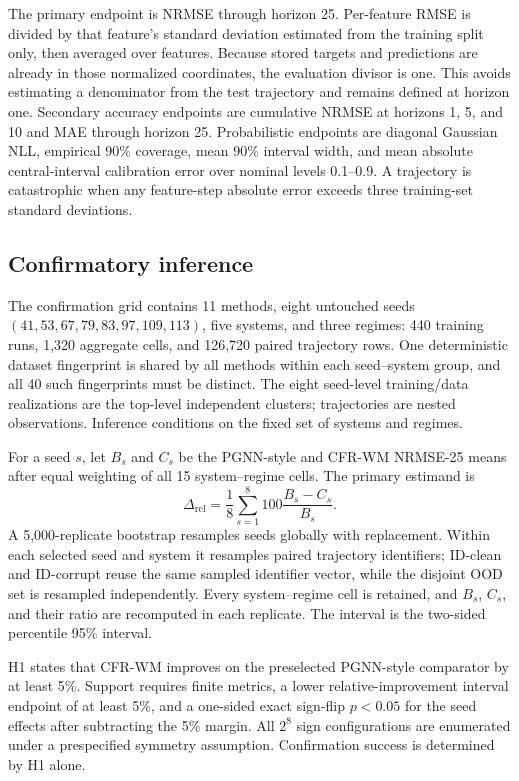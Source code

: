 \documentclass[pdflatex,sn-basic]{sn-jnl}
\newcommand{\method}{CFR-WM}
\begin{document}
The primary endpoint is NRMSE through horizon 25. Per-feature RMSE is divided
by that feature's standard deviation estimated from the training split only,
then averaged over features. Because stored targets and predictions are already
in those normalized coordinates, the evaluation divisor is one. This avoids
estimating a denominator from the test trajectory and remains defined at
horizon one. Secondary accuracy endpoints are cumulative NRMSE at horizons 1,
5, and 10 and MAE through horizon 25. Probabilistic endpoints are diagonal
Gaussian NLL, empirical 90\% coverage, mean 90\% interval width, and mean
absolute central-interval calibration error over nominal levels 0.1--0.9. A
trajectory is catastrophic when any feature-step absolute error exceeds three
training-set standard deviations.

\subsection{Confirmatory inference}

The confirmation grid contains 11 methods, eight untouched seeds
$(41,53,67,79,83,97,109,113)$, five systems, and three regimes: 440 training
runs, 1,320 aggregate cells, and 126,720 paired trajectory rows. One
deterministic dataset fingerprint is shared by all methods within each
seed--system group, and all 40 such fingerprints must be distinct. The eight
seed-level training/data realizations are the top-level independent clusters;
trajectories are nested observations. Inference conditions on the fixed set of
systems and regimes.

For a seed $s$, let $B_s$ and $C_s$ be the PGNN-style and CFR-WM NRMSE-25 means after
equal weighting of all 15 system--regime cells. The primary estimand is
\begin{equation}
 \Delta_{\mathrm{rel}}=\frac{1}{8}\sum_{s=1}^{8}
 100\frac{B_s-C_s}{B_s}.
 \label{eq:primary-estimand}
\end{equation}
A 5,000-replicate bootstrap resamples seeds globally with replacement. Within
each selected seed and system it resamples paired trajectory identifiers;
ID-clean and ID-corrupt reuse the same sampled identifier vector, while the
disjoint OOD set is resampled independently. Every system--regime cell is
retained, and $B_s$, $C_s$, and their ratio are recomputed in each replicate.
The interval is the two-sided percentile 95\% interval.

H1 states that \method{} improves on the preselected PGNN-style comparator by at least 5\%.
Support requires finite metrics, a lower relative-improvement interval endpoint
of at least 5\%, and a one-sided exact sign-flip $p<0.05$ for the seed effects
after subtracting the 5\% margin. All $2^8$ sign configurations are enumerated
under a prespecified symmetry assumption. Confirmation success is determined
by H1 alone.
\end{document}
